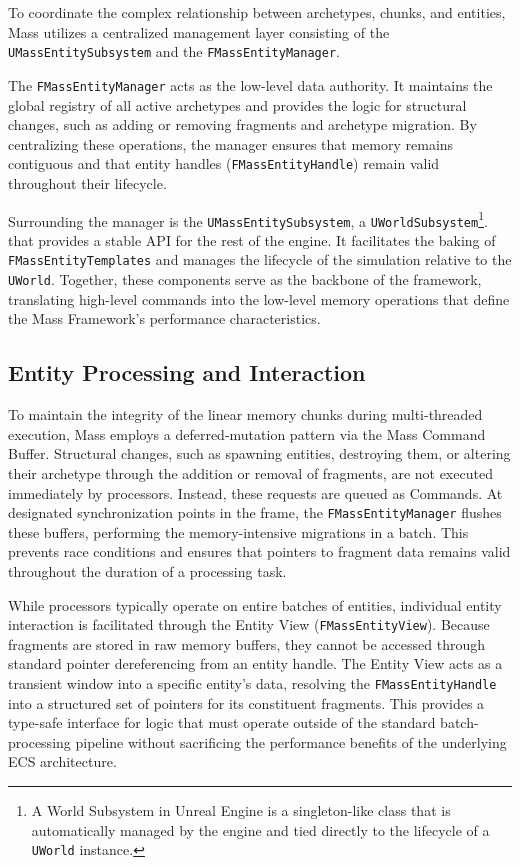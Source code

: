 To coordinate the complex relationship between archetypes, chunks, and entities, Mass utilizes a centralized management layer consisting of the \newline\texttt{UMassEntitySubsystem} and the \texttt{FMassEntityManager}.

The \texttt{FMassEntityManager} acts as the low-level data authority. It maintains the global registry of all active archetypes and provides the logic for structural changes, such as adding or removing fragments and archetype migration. By centralizing these operations, the manager ensures that memory remains contiguous and that entity handles (\texttt{FMassEntityHandle}) remain valid throughout their lifecycle.

Surrounding the manager is the \texttt{UMassEntitySubsystem}, a \texttt{UWorldSubsystem}\footnote{A World Subsystem in Unreal Engine is a singleton-like class that is automatically managed by the engine and tied directly to the lifecycle of a \texttt{UWorld} instance.}. that provides a stable API for the rest of the engine. It facilitates the baking of \texttt{FMassEntityTemplates} and manages the lifecycle of the simulation relative to the \texttt{UWorld}. Together, these components serve as the backbone of the framework, translating high-level commands into the low-level memory operations that define the Mass Framework's performance characteristics.

\subsection{Entity Processing and Interaction}

To maintain the integrity of the linear memory chunks during multi-threaded execution, Mass employs a deferred-mutation pattern via the Mass Command Buffer. Structural changes, such as spawning entities, destroying them, or altering their archetype through the addition or removal of fragments, are not executed immediately by processors. Instead, these requests are queued as Commands. At designated synchronization points in the frame, the \texttt{FMassEntityManager} flushes these buffers, performing the memory-intensive migrations in a batch. This prevents race conditions and ensures that pointers to fragment data remains valid throughout the duration of a processing task.

While processors typically operate on entire batches of entities, individual entity interaction is facilitated through the Entity View (\texttt{FMassEntityView}). Because fragments are stored in raw memory buffers, they cannot be accessed through standard pointer dereferencing from an entity handle. The Entity View acts as a transient window into a specific entity's data, resolving the \texttt{FMassEntityHandle} into a structured set of pointers for its constituent fragments. This provides a type-safe interface for logic that must operate outside of the standard batch-processing pipeline without sacrificing the performance benefits of the underlying ECS architecture.

